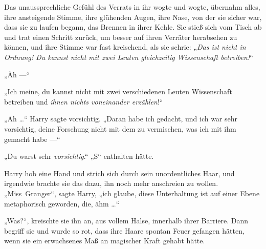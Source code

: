 Das unaussprechliche Gefühl des Verrats in ihr wogte und wogte, übernahm alles, ihre ansteigende Stimme, ihre glühenden Augen, ihre Nase, von der sie sicher war, dass sie zu laufen begann, das Brennen in ihrer Kehle. Sie stieß sich vom Tisch ab und trat einen Schritt zurück, um besser auf ihren Verräter herabsehen zu können, und ihre Stimme war fast kreischend, als sie schrie:
„\emph{Das ist nicht in Ordnung! Du kannst nicht mit zwei Leuten gleichzeitig Wissenschaft betreiben!}“

„Äh —“

„Ich meine, du kannst nicht mit zwei verschiedenen Leuten Wissenschaft betreiben und \emph{ihnen nichts voneinander erzählen}!“

„Ah …“ Harry sagte vorsichtig.
„Daran habe ich gedacht, und ich war sehr vorsichtig, deine Forschung nicht mit dem zu vermischen, was ich mit ihm gemacht habe —“

„Du warst sehr \emph{vorsichtig}.“ %
„S“ enthalten hätte.

Harry hob eine Hand und strich sich durch sein unordentliches Haar, und irgendwie brachte sie das dazu, ihn noch mehr anschreien zu wollen.
„Miss~Granger“, sagte Harry, „ich glaube, diese Unterhaltung ist auf einer Ebene metaphorisch geworden, die, ähm …“

„Was?“, kreischte sie ihn an, aus vollem Halse, innerhalb ihrer Barriere. Dann begriff sie und wurde so rot, dass ihre Haare spontan Feuer gefangen hätten, wenn sie ein erwachsenes Maß an magischer Kraft gehabt hätte.

